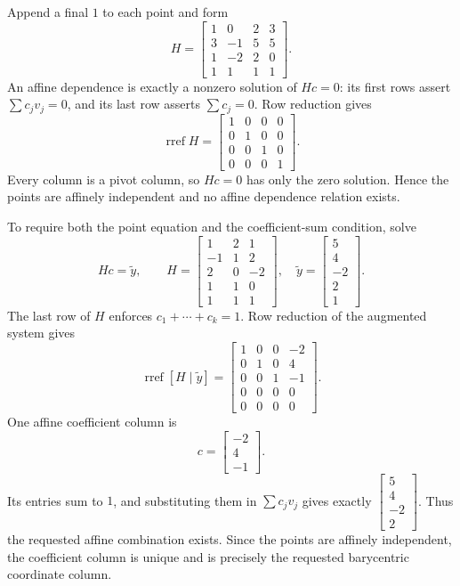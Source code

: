 Append a final $1$ to each point and form
\[H=\begin{bmatrix}1&0&2&3\\3&-1&5&5\\1&-2&2&0\\1&1&1&1\end{bmatrix}.\]
An affine dependence is exactly a nonzero solution of $Hc=0$: its first rows assert $\sum c_jv_j=0$, and its last row asserts $\sum c_j=0$. Row reduction gives
\[\operatorname{rref}H=\begin{bmatrix}1&0&0&0\\0&1&0&0\\0&0&1&0\\0&0&0&1\end{bmatrix}.\]
Every column is a pivot column, so $Hc=0$ has only the zero solution. Hence the points are affinely independent and no affine dependence relation exists.

To require both the point equation and the coefficient-sum condition, solve
\[Hc=\widetilde y,\qquad H=\begin{bmatrix}1&2&1\\-1&1&2\\2&0&-2\\1&1&0\\1&1&1\end{bmatrix},\quad\widetilde y=\begin{bmatrix}5\\4\\-2\\2\\1\end{bmatrix}.\]
The last row of $H$ enforces $c_1+\cdots+c_k=1$. Row reduction of the augmented system gives
\[\operatorname{rref}[H\mid\widetilde y]=\begin{bmatrix}1&0&0&-2\\0&1&0&4\\0&0&1&-1\\0&0&0&0\\0&0&0&0\end{bmatrix}.\]
One affine coefficient column is
\[c=\begin{bmatrix}-2\\4\\-1\end{bmatrix}.\]
Its entries sum to $1$, and substituting them in $\sum c_jv_j$ gives exactly $\begin{bmatrix}5\\4\\-2\\2\end{bmatrix}$. Thus the requested affine combination exists. Since the points are affinely independent, the coefficient column is unique and is precisely the requested barycentric coordinate column.

